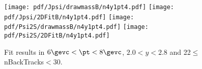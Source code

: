 \begin{figure}[H]
\begin{center}
\texttt{[image: pdf/Jpsi/drawmassB/n4y1pt4.pdf]}
\texttt{[image: pdf/Jpsi/2DFitB/n4y1pt4.pdf]}
\vspace*{-0.5cm}
\texttt{[image: pdf/Psi2S/drawmassB/n4y1pt4.pdf]}
\texttt{[image: pdf/Psi2S/2DFitB/n4y1pt4.pdf]}
\vspace*{-0.5cm}
\end{center}
\caption{Fit results in $6\gevc<\pt<8\gevc$, $2.0<y<2.8$ and 22$\leq$nBackTracks$<$30.}
\label{Fitn4y1pt4}
\end{figure}
